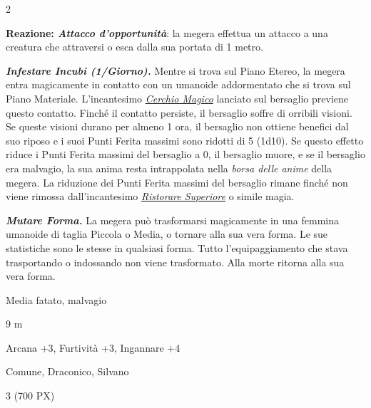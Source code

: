 \begin{multicols}{2}
{\textbf{Reazione: \emph{Attacco d'opportunità}}: la megera effettua un attacco a una creatura che attraversi o esca dalla sua portata di 1 metro.

\emph{\textbf{Infestare Incubi (1/Giorno).}} Mentre si trova sul Piano Etereo, la megera entra magicamente in contatto con un umanoide addormentato che si trova sul Piano Materiale. L'incantesimo \emph{\hyperlink{Cerchio Magico}{Cerchio Magico}} lanciato sul bersaglio previene questo contatto. Finché il contatto persiste, il bersaglio soffre di orribili visioni. Se queste visioni durano per almeno 1 ora, il bersaglio non ottiene benefici dal suo riposo e i suoi Punti Ferita massimi sono ridotti di 5 (1d10). Se questo effetto riduce i Punti Ferita massimi del bersaglio a 0, il bersaglio muore, e se il bersaglio era malvagio, la sua anima resta intrappolata nella \emph{borsa delle anime} della megera. La riduzione dei Punti Ferita massimi del bersaglio rimane finché non viene rimossa dall'incantesimo \emph{\hyperlink{Ristorare Superiore}{Ristorare Superiore}} o simile magia.

\emph{\textbf{Mutare Forma.}} La megera può trasformarsi magicamente in una femmina umanoide di taglia Piccola o Media, o tornare alla sua vera forma. Le sue statistiche sono le stesse in qualsiasi forma. Tutto l'equipaggiamento che stava trasportando o indossando non viene trasformato. Alla morte ritorna alla sua vera forma.

\begin{description}[noitemsep, topsep=0pt, parsep=0pt, partopsep=0pt, itemsep=1pt, leftmargin=2.35cm,  labelwidth=2.2cm, itemindent=0cm, listparindent=0pt] %
\setlength{\baselineskip}{10pt}
\item[\textbf{Taglia/Tipo}] Media fatato, malvagio
\item[\textbf{Caratt.}] 
\item[\textbf{Punti Ferita}] 
\item[\textbf{Movimento}] 9 m
\item[\textbf{Tiri Salvez.}] 
\item[\textbf{Comp.}] Arcana +3, Furtività +3, Ingannare +4
\item[\textbf{Sensi}] 
\item[\textbf{Linguaggi}] Comune, Draconico, Silvano
\item[\textbf{Sfida}] 3 (700 PX)
\end{description}
\smallskip

}
\end{multicols}
